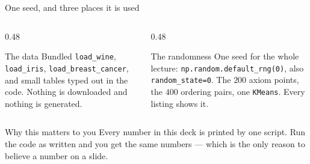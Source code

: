 \documentclass[aspectratio=169]{beamer}
\begin{document}
\begin{frame}{One seed, and three places it is used}
  \begin{columns}[T]
    \begin{column}{0.48\textwidth}
      \begin{block}{The data}
        \small Bundled \texttt{load\_wine}, \texttt{load\_iris},
        \texttt{load\_breast\_cancer}, and small tables typed out in the
        code. Nothing is downloaded and nothing is generated.
      \end{block}
    \end{column}
    \begin{column}{0.48\textwidth}
      \begin{block}{The randomness}
        \small One seed for the whole lecture:
        \texttt{np.random.default\_rng(0)}, also \texttt{random\_state=0}.
        The $200$ axiom points, the $400$ ordering pairs, one
        \texttt{KMeans}. Every listing shows it.
      \end{block}
    \end{column}
  \end{columns}
  \vspace{0.5em}
  \begin{exampleblock}{Why this matters to you}
    \centering\small
    Every number in this deck is printed by one script. Run the code as
    written and you get the same numbers --- which is the only reason to
    believe a number on a slide.
  \end{exampleblock}
\end{frame}
\end{document}
